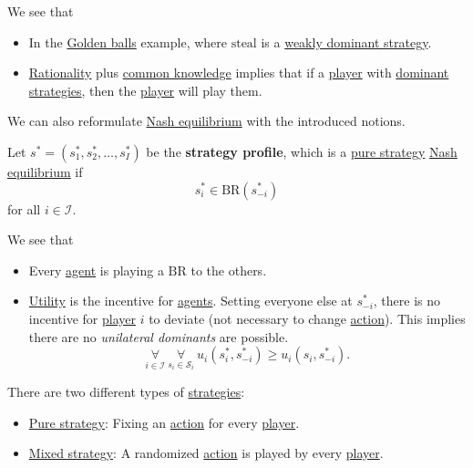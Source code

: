 \begin{remark}
	We see that
	\begin{itemize}
		\item In the \hyperref[eg:golden-ball]{Golden balls} example, where \(\text{steal}\) is a \hyperref[def:weakly-dominant-strategy]{weakly dominant strategy}.
		\item \hyperref[rationality]{Rationality} plus \hyperref[common-knowledge]{common knowledge} implies that if a \hyperref[def:player]{player} with \hyperref[def:dominant-strategy]{dominant strategies}, then the \hyperref[def:player]{player} will play them.
	\end{itemize}
\end{remark}

We can also reformulate \hyperref[def:Nash-equilibrium]{Nash equilibrium} with the introduced notions.

\begin{prev}
	Let \(s^{\ast} = (s_1^{\ast}, s_2^{\ast}, \dots , s_I^{\ast})\) be the \textbf{strategy profile}, which is a \hyperref[def:pure-strategy]{pure strategy} \hyperref[def:Nash-equilibrium]{Nash equilibrium} if
	\[
		s_{i}^{\ast}\in\mathrm{BR}(s_{-i}^{\ast})
	\]
	for all \(i\in \mathcal{I} \).
\end{prev}

\begin{note}
	We see that
	\begin{itemize}
		\item Every \hyperref[def:player]{agent} is playing a \(\mathrm{BR}\) to the others.
		\item \hyperref[def:reward]{Utility} is the incentive for \hyperref[def:player]{agents}. Setting everyone else at \(s^{\ast}_{-i}\), there is no incentive for \hyperref[def:player]{player} \(i\) to deviate (not necessary to change \hyperref[def:strategy]{action}). This implies there are no \emph{unilateral dominants} are possible.
		      \[
			      \underset{i\in \mathcal{I}}{\forall}\ \underset{s_{i}\in \mathcal{S}_i}{\forall}\ u_{i}(s^{\ast}_i, s^{\ast}_{-i}) \geq u_{i}(s_{i}, s^{\ast}_{-i}).
		      \]
	\end{itemize}
\end{note}

\begin{prev}
	There are two different types of \hyperref[def:strategy]{strategies}:
	\begin{itemize}
		\item \hyperref[def:pure-strategy]{Pure strategy}: Fixing an \hyperref[def:strategy]{action} for every \hyperref[def:player]{player}.
		\item \hyperref[def:mixed-strategy]{Mixed strategy}: A randomized \hyperref[def:strategy]{action} is played by every \hyperref[def:player]{player}.
	\end{itemize}
\end{prev}

